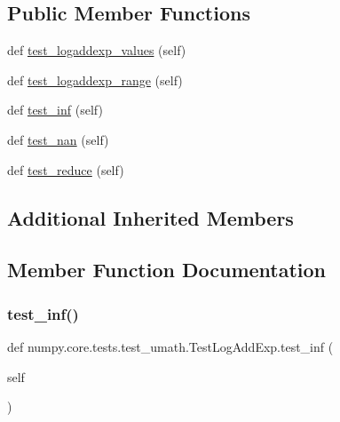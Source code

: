 \subsection*{Public Member Functions}
\begin{DoxyCompactItemize}
\item 
def \hyperlink{classnumpy_1_1core_1_1tests_1_1test__umath_1_1TestLogAddExp_adad9f488f944bf8c91c6c67693e217b1}{test\+\_\+logaddexp\+\_\+values} (self)
\item 
def \hyperlink{classnumpy_1_1core_1_1tests_1_1test__umath_1_1TestLogAddExp_a5898d0bd258043e7e5b7a67d463e50cc}{test\+\_\+logaddexp\+\_\+range} (self)
\item 
def \hyperlink{classnumpy_1_1core_1_1tests_1_1test__umath_1_1TestLogAddExp_a4d2faf85b5c55529fbfbb0f1041f946b}{test\+\_\+inf} (self)
\item 
def \hyperlink{classnumpy_1_1core_1_1tests_1_1test__umath_1_1TestLogAddExp_aac2bf5a24b40497c6d0d5dfab89cef66}{test\+\_\+nan} (self)
\item 
def \hyperlink{classnumpy_1_1core_1_1tests_1_1test__umath_1_1TestLogAddExp_a3c7151b3bd605d84197a016e5fdda7db}{test\+\_\+reduce} (self)
\end{DoxyCompactItemize}
\subsection*{Additional Inherited Members}


\subsection{Member Function Documentation}
\mbox{\label{classnumpy_1_1core_1_1tests_1_1test__umath_1_1TestLogAddExp_a4d2faf85b5c55529fbfbb0f1041f946b}} 
\subsubsection{\texorpdfstring{test\+\_\+inf()}{test\_inf()}}
{\footnotesize\ttfamily def numpy.\+core.\+tests.\+test\+\_\+umath.\+Test\+Log\+Add\+Exp.\+test\+\_\+inf (\begin{DoxyParamCaption}\item[{}]{self }\end{DoxyParamCaption})}

